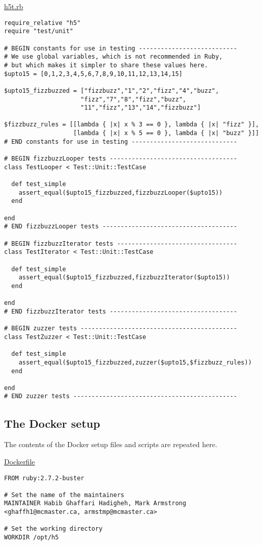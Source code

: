 \documentclass[11pt]{article}
\begin{document}
\href{./testing/h5/h5t.rb}{h5t.rb}
\begin{verbatim}
require_relative "h5"
require "test/unit"

# BEGIN constants for use in testing ---------------------------
# We use global variables, which is not recommended in Ruby,
# but which makes it simpler to share these values here.
$upto15 = [0,1,2,3,4,5,6,7,8,9,10,11,12,13,14,15]

$upto15_fizzbuzzed = ["fizzbuzz","1","2","fizz","4","buzz",
                     "fizz","7","8","fizz","buzz",
                     "11","fizz","13","14","fizzbuzz"]

$fizzbuzz_rules = [[lambda { |x| x % 3 == 0 }, lambda { |x| "fizz" }],
                   [lambda { |x| x % 5 == 0 }, lambda { |x| "buzz" }]]
# END constants for use in testing -----------------------------

# BEGIN fizzbuzzLooper tests -----------------------------------
class TestLooper < Test::Unit::TestCase

  def test_simple
    assert_equal($upto15_fizzbuzzed,fizzbuzzLooper($upto15))
  end

end
# END fizzbuzzLooper tests -------------------------------------

# BEGIN fizzbuzzIterator tests ---------------------------------
class TestIterator < Test::Unit::TestCase

  def test_simple
    assert_equal($upto15_fizzbuzzed,fizzbuzzIterator($upto15))
  end

end
# END fizzbuzzIterator tests -----------------------------------

# BEGIN zuzzer tests -------------------------------------------
class TestZuzzer < Test::Unit::TestCase

  def test_simple
    assert_equal($upto15_fizzbuzzed,zuzzer($upto15,$fizzbuzz_rules))
  end

end
# END zuzzer tests ---------------------------------------------
\end{verbatim}

\subsection*{The Docker setup}
\label{sec:org2281098}
The contents of the Docker setup files and scripts are repeated here.

\href{./testing/h5/Dockerfile}{Dockerfile}
\begin{verbatim}
FROM ruby:2.7.2-buster

# Set the name of the maintainers
MAINTAINER Habib Ghaffari Hadigheh, Mark Armstrong <ghaffh1@mcmaster.ca, armstmp@mcmaster.ca>

# Set the working directory
WORKDIR /opt/h5
\end{verbatim}
\end{document}
